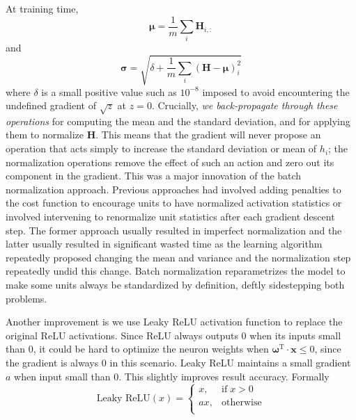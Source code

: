 At training time,
\begin{equation}
\boldsymbol{\mu} = \frac{1}{m}\sum_i \mathbf{H}_{i,:}
\end{equation}
and
\begin{equation}
\boldsymbol{\sigma} = \sqrt{\delta + \frac{1}{m} \sum_i \left(\mathbf{H} - \boldsymbol{\mu}\right)^2_i}
\end{equation}
where $\delta$ is a small positive value such as $10^{-8}$ imposed to avoid encountering
the undefined gradient of $\sqrt{z}$ at $z = 0$. Crucially, \textit{we back-propagate through
these operations} for computing the mean and the standard deviation, and for
applying them to normalize $\mathbf{H}$. This means that the gradient will never propose
an operation that acts simply to increase the standard deviation or mean of
$h_i$; the normalization operations remove the effect of such an action and zero
out its component in the gradient. This was a major innovation of the batch
normalization approach. Previous approaches had involved adding penalties to
the cost function to encourage units to have normalized activation statistics or
involved intervening to renormalize unit statistics after each gradient descent step.
The former approach usually resulted in imperfect normalization and the latter
usually resulted in significant wasted time as the learning algorithm repeatedly
proposed changing the mean and variance and the normalization step repeatedly
undid this change. Batch normalization reparametrizes the model to make some
units always be standardized by definition, deftly sidestepping both problems.

Another improvement is we use Leaky ReLU activation function to replace the
original ReLU activations.
Since ReLU always outputs $0$ when its inputs small than $0$,
it could be hard to optimize the neuron weights when 
$\boldsymbol{\omega}^{\textrm{T}} \cdot \mathbf{x} \le 0$,
since the gradient is always $0$ in this scenario.
Leaky ReLU maintains a small gradient $a$ when input small than $0$.
This slightly improves result accuracy. Formally
\begin{equation}
\textrm{Leaky ReLU}(x)= \left\{
    \begin{array}{rl}
    x ,& \textrm{if} \; x > 0 \\
    ax ,& \textrm{otherwise} \\
    \end{array}
\right.
\end{equation}

